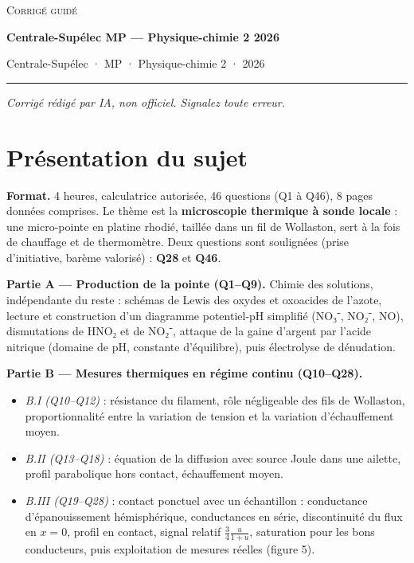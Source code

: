 \documentclass[11pt,a4paper]{article}
\providecommand{\tightlist}{\setlength{\itemsep}{0pt}\setlength{\parskip}{0pt}}
\begin{document}
\thispagestyle{plain}
\begin{center}
  {\small\scshape Corrigé guidé}\par\smallskip
  {\LARGE\bfseries Centrale-Supélec MP — Physique-chimie 2 2026\par}\medskip
  {\large Centrale-Supélec · MP · Physique-chimie 2 · 2026\par}
\end{center}
\vspace{2pt}\hrule\vspace{8pt}

\emph{Corrigé rédigé par IA, non officiel. Signalez toute erreur.}

\hypertarget{pruxe9sentation-du-sujet}{%
\section{Présentation du sujet}\label{pruxe9sentation-du-sujet}}

\textbf{Format.} 4 heures, calculatrice autorisée, 46 questions (Q1 à Q46), 8 pages données comprises. Le thème est la \textbf{microscopie thermique à sonde locale} : une micro-pointe en platine rhodié, taillée dans un fil de Wollaston, sert à la fois de chauffage et de thermomètre. Deux questions sont soulignées (prise d'initiative, barème valorisé) : \textbf{Q28} et \textbf{Q46}.

\textbf{Partie A --- Production de la pointe (Q1--Q9).} Chimie des solutions, indépendante du reste : schémas de Lewis des oxydes et oxoacides de l'azote, lecture et construction d'un diagramme potentiel-pH simplifié (NO₃⁻, NO₂⁻, NO), dismutations de HNO₂ et de NO₂⁻, attaque de la gaine d'argent par l'acide nitrique (domaine de pH, constante d'équilibre), puis électrolyse de dénudation.

\textbf{Partie B --- Mesures thermiques en régime continu (Q10--Q28).}

\begin{itemize}
\tightlist
\item
  \emph{B.I (Q10--Q12)} : résistance du filament, rôle négligeable des fils de Wollaston, proportionnalité entre la variation de tension et la variation d'échauffement moyen.
\item
  \emph{B.II (Q13--Q18)} : équation de la diffusion avec source Joule dans une ailette, profil parabolique hors contact, échauffement moyen.
\item
  \emph{B.III (Q19--Q28)} : contact ponctuel avec un échantillon : conductance d'épanouissement hémisphérique, conductances en série, discontinuité du flux en \(x=0\), profil en contact, signal relatif \(\frac34\frac{u}{1+u}\), saturation pour les bons conducteurs, puis exploitation de mesures réelles (figure 5).
\end{itemize}
\end{document}
